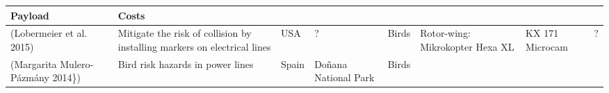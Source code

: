 \documentclass[]{interact}
\theoremstyle{plain}%
\theoremstyle{definition}
\theoremstyle{remark}
\begin{document}
\begin{longtable}[]{@{}llllllll@{}}
\begin{minipage}[b]{0.11\columnwidth}
Payload\strut
\end{minipage} & \begin{minipage}[b]{0.01\columnwidth}\raggedright\strut
Costs\strut
\end{minipage}\tabularnewline
\midrule
\endhead
\begin{minipage}[t]{0.11\columnwidth}\raggedright\strut
(Lobermeier et al. 2015)\strut
\end{minipage} & \begin{minipage}[t]{0.18\columnwidth}\raggedright\strut
Mitigate the risk of collision by installing markers on electrical
lines\strut
\end{minipage} & \begin{minipage}[t]{0.03\columnwidth}\raggedright\strut
USA\strut
\end{minipage} & \begin{minipage}[t]{0.14\columnwidth}\raggedright\strut
?\strut
\end{minipage} & \begin{minipage}[t]{0.10\columnwidth}\raggedright\strut
Birds\strut
\end{minipage} & \begin{minipage}[t]{0.09\columnwidth}\raggedright\strut
Rotor-wing: Mikrokopter Hexa XL\strut
\end{minipage} & \begin{minipage}[t]{0.11\columnwidth}\raggedright\strut
KX 171 Microcam\strut
\end{minipage} & \begin{minipage}[t]{0.01\columnwidth}\raggedright\strut
?\strut
\end{minipage}\tabularnewline
\begin{minipage}[t]{0.11\columnwidth}\raggedright\strut
(Margarita Mulero-Pázmány 2014\})\strut
\end{minipage} & \begin{minipage}[t]{0.18\columnwidth}\raggedright\strut
Bird risk hazards in power lines\strut
\end{minipage} & \begin{minipage}[t]{0.03\columnwidth}\raggedright\strut
Spain\strut
\end{minipage} & \begin{minipage}[t]{0.14\columnwidth}\raggedright\strut
Doñana National Park\strut
\end{minipage} & \begin{minipage}[t]{0.10\columnwidth}\raggedright\strut
Birds\strut
\end{minipage} & \begin{minipage}[t]{0.09\columnwidth}\raggedright\strut

\end{minipage}
\end{longtable}
\end{document}
